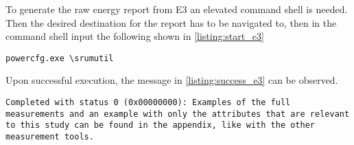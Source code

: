 To generate the raw energy report from E3 an elevated command shell is needed. Then the desired destination for the report has to be navigated to, then in the command shell input the following shown in \cref{listing:start_e3}

\begin{lstlisting}[caption=How to start E3, label=listing:start_e3]
    powercfg.exe \srumutil
\end{lstlisting}

Upon successful execution, the message in \cref{listing:success_e3} can be observed.

\begin{lstlisting}[caption=If the report is created successfully
    , label=listing:success_e3]
    Completed with status 0 (0x00000000): Examples of the full measurements and an example with only the attributes that are relevant to this study can be found in the appendix, like with the other measurement tools.
\end{lstlisting}



% 